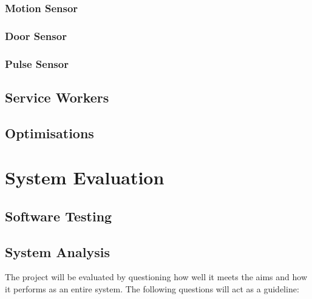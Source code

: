 \documentclass[final]{cmpreport}
\begin{document}
        \subsubsection{Motion Sensor}
        
        \subsubsection{Door Sensor}
        
        \subsubsection{Pulse Sensor}
        
    \subsection{Service Workers}
    
    \subsection{Optimisations}
    
\section{System Evaluation}
    
    \subsection{Software Testing}
    
    \subsection{System Analysis}
    
    The project will be evaluated by questioning how well it meets the aims and how it performs as an entire system. The following questions will act as a guideline:
    
\end{document}
